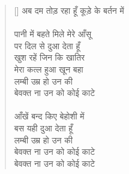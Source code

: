\begin{verse}[\versewidth]
{अब दम तोड़ रहा हूँ कूड़े के बर्तन में\\
\\
पानी में बहते मिले मेरे आँसू\\
पर दिल से दुआ देता हूँ\\
खुश रहें जिन कि खातिर\\
मेरा कत्ल हुआ खून बहा\\
लम्बी उम्र हो उन की\\
बेवक्त ना उन को कोई काटे\\
\\
आँखें बन्द किए बेहोशी में\\
बस यही दुआ देता हूँ\\
लम्बी उम्र हो उन की\\
बेवक्त ना उन को कोई काटे\\
बेवक्त ना उन को कोई काटे
}
\end{verse}

